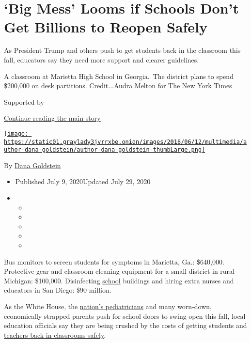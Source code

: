 \hypertarget{big-mess-looms-if-schools-dont-get-billions-to-reopen-safely}{%
\section{`Big Mess' Looms if Schools Don't Get Billions to Reopen
Safely}\label{big-mess-looms-if-schools-dont-get-billions-to-reopen-safely}}

As President Trump and others push to get students back in the classroom
this fall, educators say they need more support and clearer guidelines.

A classroom at Marietta High School in Georgia.~The district plans to
spend \$200,000 on desk partitions. Credit...Audra Melton for The New
York Times

Supported by

\protect\hyperlink{after-sponsor}{Continue reading the main story}

\href{https://www.nytimes3xbfgragh.onion/by/dana-goldstein}{\texttt{[image: https://static01.graylady3jvrrxbe.onion/images/2018/06/12/multimedia/author-dana-goldstein/author-dana-goldstein-thumbLarge.png]}}

By \href{https://www.nytimes3xbfgragh.onion/by/dana-goldstein}{Dana
Goldstein}

\begin{itemize}
\item
  Published July 9, 2020Updated July 29, 2020
\item
  \begin{itemize}
  \item
  \item
  \item
  \item
  \item
  \end{itemize}
\end{itemize}

Bus monitors to screen students for symptoms in Marietta, Ga.:
\$640,000. Protective gear and classroom cleaning equipment for a small
district in rural Michigan: \$100,000. Disinfecting
\href{https://www.nytimes3xbfgragh.onion/2020/07/10/us/politics/trump-schools-reopening.html}{school}
buildings and hiring extra nurses and educators in San Diego: \$90
million.

As the White House, the
\href{https://www.nytimes3xbfgragh.onion/2020/06/30/us/coronavirus-schools-reopening-guidelines-aap.html}{nation's
pediatricians} and many worn-down, economically strapped parents push
for school doors to swing open this fall, local education officials say
they are being crushed by the costs of getting students and
\href{https://www.nytimes3xbfgragh.onion/2020/07/11/us/virus-teachers-classrooms.html}{teachers
back in classrooms safely}.

